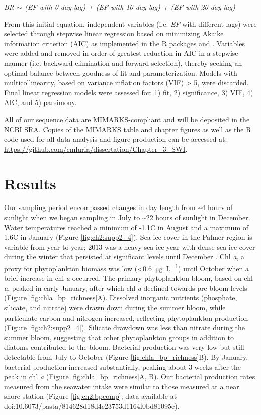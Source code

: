 \emph{BR $\sim$ (EF with 0-day lag) + (EF with 10-day lag) + (EF with 20-day lag)}

From this initial equation, independent variables (i.e. \emph{EF} with different lags) were selected through stepwise linear regression based on minimizing Akaike information criterion (AIC) as implemented in the R packages  and  \citep{venables2002modern,zeileis2016dynlm}. Variables were added and removed in order of greatest reduction in AIC in a stepwise manner (i.e. backward elimination and forward selection), thereby seeking an optimal balance between goodness of fit and parameterization. Models with multicollinearity, based on variance inflation factors (VIF) > 5, were discarded. Final linear regression models were assessed for: 1) fit, 2) significance, 3) VIF, 4) AIC, and 5) parsimony.

All of our sequence data are MIMARKS-compliant \citep{Yilmaz:2011aa} and will be deposited in the NCBI SRA. Copies of the MIMARKS table and chapter figures as well as the R code used for all data analysis and figure production can be accessed at: \url{https://github.com/cmluria/dissertation/Chapter_3_SWI}. 

\section{Results}\label{results}

Our sampling period encompassed changes in day length from \textasciitilde{}4 hours of sunlight when we began sampling in July to \textasciitilde{}22 hours of sunlight in December. Water temperatures reached a minimum of \hbox{-}1.1\textdegree C in August and a maximum of 1.6\textdegree C in January (Figure \ref{fig:ch2:supp2_4}). Sea ice cover in the Palmer region is variable from year to year; 2013 was a heavy sea ice year with dense sea ice cover during the winter that persisted at significant levels until December \citep{Stammerjohn2008-nj, massom2014state}. Chl \textit{a}, a proxy for phytoplankton biomass was low (\textless{}\SI{0.6}{\micro\gram\per\liter}) until October when a brief increase in chl \textit{a} occurred. The primary phytoplankton bloom, based on chl \textit{a}, peaked in early January, after which chl \textit{a} declined towards pre-bloom levels (Figure \ref{fig:chla_bp_richness}A). Dissolved inorganic nutrients (phosphate, silicate, and nitrate) were drawn down during the summer bloom, while particulate carbon and nitrogen increased, reflecting phytoplankton production (Figure \ref{fig:ch2:supp2_4}). Silicate drawdown was less than nitrate during the summer bloom, suggesting that other phytoplankton groups in addition to diatoms contributed to the bloom. Bacterial production was very low but still detectable from July to October (Figure \ref{fig:chla_bp_richness}B). By January, bacterial production increased substantially, peaking about 3 weeks after the peak in chl \textit{a} (Figure \ref{fig:chla_bp_richness}A, B). Our bacterial production rates measured from the seawater intake were similar to those measured at a near shore station (Figure \ref{fig:ch2:bpcomp}; data available at doi:10.6073/pasta/814628d18d4e23753d1164f0bd81095e). 

